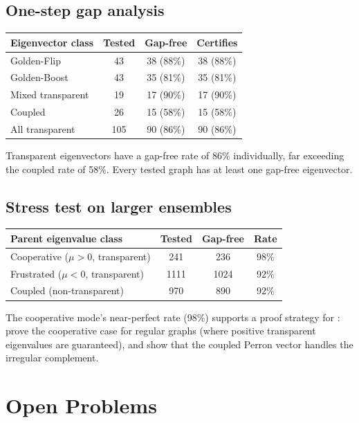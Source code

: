 \documentclass[11pt]{amsart}
\theoremstyle{definition}
\theoremstyle{remark}
\begin{document}
\subsection{One-step gap analysis}

\begin{center}
\begin{tabular}{lccc}
\toprule
Eigenvector class & Tested & Gap-free & Certifies \\
\midrule
Golden-Flip & 43 & 38 (88\%) & 38 (88\%) \\
Golden-Boost & 43 & 35 (81\%) & 35 (81\%) \\
Mixed transparent & 19 & 17 (90\%) & 17 (90\%) \\
Coupled & 26 & 15 (58\%) & 15 (58\%) \\
\midrule
All transparent & 105 & 90 (86\%) & 90 (86\%) \\
\bottomrule
\end{tabular}
\end{center}

Transparent eigenvectors have a gap-free rate of 86\% individually, 
far exceeding the coupled rate of 58\%.  Every tested graph has at 
least one gap-free eigenvector.

\subsection{Stress test on larger ensembles}

\begin{center}
\begin{tabular}{lccc}
\toprule
Parent eigenvalue class & Tested & Gap-free & Rate \\
\midrule
Cooperative ($\mu > 0$, transparent) & 241 & 236 & 98\% \\
Frustrated ($\mu < 0$, transparent) & 1111 & 1024 & 92\% \\
Coupled (non-transparent) & 970 & 890 & 92\% \\
\bottomrule
\end{tabular}
\end{center}

The cooperative mode's near-perfect rate (98\%) supports a proof 
strategy for : prove the cooperative case for 
regular graphs (where positive transparent eigenvalues are guaranteed), 
and show that the coupled Perron vector handles the irregular complement.


\section{Open Problems}\label{sec:open}
\end{document}
